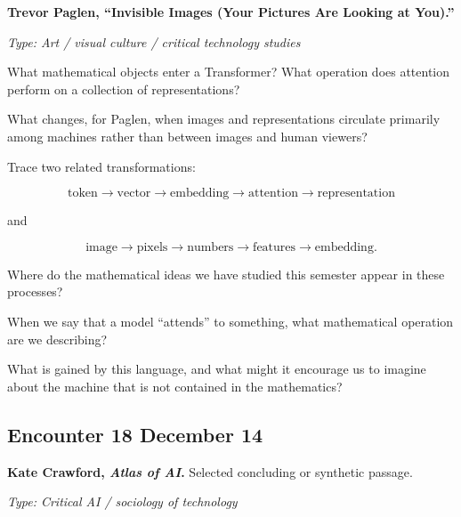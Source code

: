 \medskip

\textbf{Trevor Paglen,
``Invisible Images (Your Pictures Are Looking at You).''}

\textit{Type: Art / visual culture / critical technology studies}

\begin{description}[leftmargin=1.15in,style=nextline]

\item[\textcolor{LangRed}{READ}]
What mathematical objects enter a Transformer?
What operation does attention perform on a collection of
representations?

What changes, for Paglen, when images and representations circulate
primarily among machines rather than between images and human viewers?

\item[\textcolor{LangRed}{CONNECT}]
Trace two related transformations:

\[
\text{token}
\longrightarrow
\text{vector}
\longrightarrow
\text{embedding}
\longrightarrow
\text{attention}
\longrightarrow
\text{representation}
\]

and

\[
\text{image}
\longrightarrow
\text{pixels}
\longrightarrow
\text{numbers}
\longrightarrow
\text{features}
\longrightarrow
\text{embedding}.
\]

Where do the mathematical ideas we have studied this semester
appear in these processes?

\item[\textcolor{LangRed}{QUESTION}]
When we say that a model ``attends'' to something, what mathematical
operation are we describing?

What is gained by this language, and what might it encourage us to
imagine about the machine that is not contained in the mathematics?

\end{description}

\subsection*{Encounter 18 \hfill December 14}

\textbf{Kate Crawford, \emph{Atlas of AI}.}
Selected concluding or synthetic passage. \parencite{crawford2021}

\textit{Type: Critical AI / sociology of technology}

